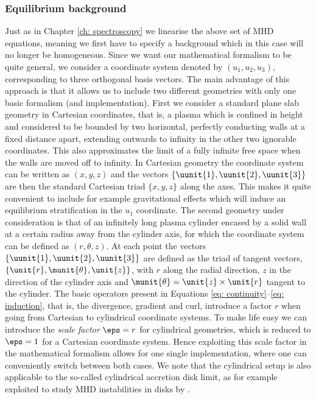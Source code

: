\subsubsection{Equilibrium background}
Just as in Chapter \ref{ch: spectroscopy} we linearise the above set of MHD equations, meaning we first have to specify a background which in this case will no longer be homogeneous. Since we want our mathematical formalism to be quite general, we consider a coordinate system denoted by $(u_1, u_2, u_3)$, corresponding to three orthogonal basis vectors. The main advantage of this approach is that it allows us to include two different geometries with only one basic formalism (and implementation). First we consider a standard plane slab geometry in Cartesian coordinates, that is, a plasma which is confined in height and considered to be bounded by two horizontal, perfectly conducting walls at a fixed distance apart, extending outwards to infinity in the other two ignorable coordinates. This also approximates the limit of a fully infinite free space when the walls are moved off to infinity. In Cartesian geometry the coordinate system can be written as $(x, y, z)$ and the vectors $\{\uunit{1}, \uunit{2}, \uunit{3}\}$ are then the standard Cartesian triad $\{\unit{x}, \unit{y}, \unit{z}\}$ along the axes. This makes it quite convenient to include for example gravitational effects which will induce an equilibrium stratification in the $u_1$ coordinate. The second geometry under consideration is that of an infinitely long plasma cylinder encased by a solid wall at a certain radius away from the cylinder axis, for which the coordinate system can be defined as $(r, \theta, z)$. At each point the vectors $\{\uunit{1}, \uunit{2}, \uunit{3}\}$ are defined as the triad of tangent vectors, $\{\unit{r}, \munit{\theta}, \unit{z}\}$, with $\unit{r}$ along the radial direction, $\unit{z}$ in the direction of the cylinder axis and $\munit{\theta} = \unit{z} \times \unit{r}$ tangent to the cylinder.
The basic operators present in Equations \eqref{eq: continuity}--\eqref{eq: induction}, that is, the divergence, gradient and curl, introduce a factor $r$ when going from Cartesian to cylindrical coordinate systems. To make life easy we can introduce the \emph{scale factor} $\eps = r$ for cylindrical geometries, which is reduced to $\eps = 1$ for a Cartesian coordinate system. Hence exploiting this scale factor in the mathematical formalism allows for one single implementation, where one can conveniently switch between both cases. We note that the cylindrical setup is also applicable to the so-called cylindrical accretion disk limit, as for example exploited to study MHD instabilities in disks by \citet{blokland2007}.

